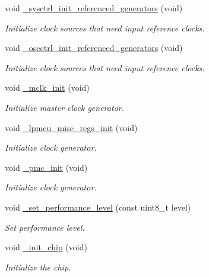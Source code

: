 \begin{DoxyCompactItemize}
\mbox{\label{group___h_p_l_ga3e5e49081818470968093b6e3597ab5f}} 
void \hyperlink{group___h_p_l_ga3e5e49081818470968093b6e3597ab5f}{\+\_\+sysctrl\+\_\+init\+\_\+referenced\+\_\+generators} (void)
\begin{DoxyCompactList}\small\item\em Initialize clock sources that need input reference clocks. \end{DoxyCompactList}\item 
\mbox{\label{group___h_p_l_ga2e4746bc23999fe1dc7c02aa4e167bfb}} 
void \hyperlink{group___h_p_l_ga2e4746bc23999fe1dc7c02aa4e167bfb}{\+\_\+oscctrl\+\_\+init\+\_\+referenced\+\_\+generators} (void)
\begin{DoxyCompactList}\small\item\em Initialize clock sources that need input reference clocks. \end{DoxyCompactList}\item 
\mbox{\label{group___h_p_l_ga840b5c5290dd94e858db4d89259ba3f4}} 
void \hyperlink{group___h_p_l_ga840b5c5290dd94e858db4d89259ba3f4}{\+\_\+mclk\+\_\+init} (void)
\begin{DoxyCompactList}\small\item\em Initialize master clock generator. \end{DoxyCompactList}\item 
void \hyperlink{group___h_p_l_ga3dd85007c9fdeed2ffe1166a33dd6519}{\+\_\+lpmcu\+\_\+misc\+\_\+regs\+\_\+init} (void)
\begin{DoxyCompactList}\small\item\em Initialize clock generator. \end{DoxyCompactList}\item 
\mbox{\label{group___h_p_l_ga580e99e942064901ed0f02f5d8789c7a}} 
void \hyperlink{group___h_p_l_ga580e99e942064901ed0f02f5d8789c7a}{\+\_\+pmc\+\_\+init} (void)
\begin{DoxyCompactList}\small\item\em Initialize clock generator. \end{DoxyCompactList}\item 
void \hyperlink{group___h_p_l_ga1668b7fc690ec56e1f3d54d9f3b8e5f2}{\+\_\+set\+\_\+performance\+\_\+level} (const uint8\+\_\+t level)
\begin{DoxyCompactList}\small\item\em Set performance level. \end{DoxyCompactList}\item 
void \hyperlink{group___h_p_l_gac10942d1aec3f0ce14117119db5e9555}{\+\_\+init\+\_\+chip} (void)
\begin{DoxyCompactList}\small\item\em Initialize the chip. \end{DoxyCompactList}\end{DoxyCompactItemize}
